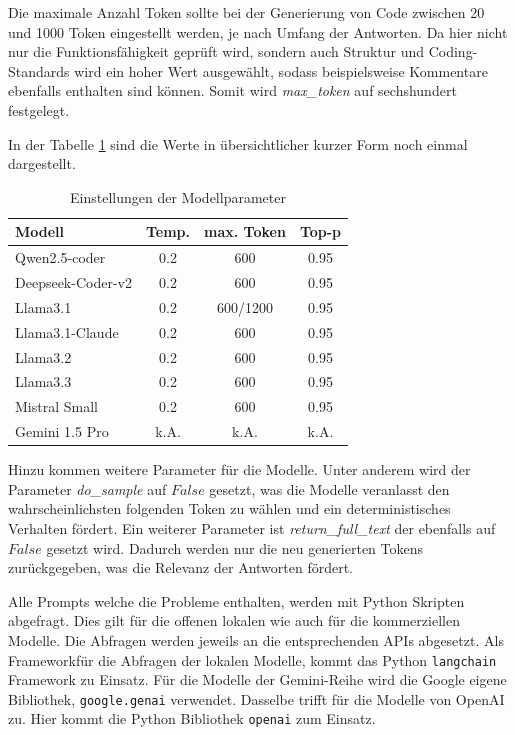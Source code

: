 Die maximale Anzahl Token sollte bei der Generierung von Code zwischen 20 und 1000 Token eingestellt werden, je nach Umfang der Antworten. Da hier nicht nur die Funktionsfähigkeit geprüft wird, sondern auch Struktur und Coding-Standards wird ein hoher Wert ausgewählt, sodass beispielsweise Kommentare ebenfalls enthalten sind können. Somit wird \textit{max\_token} auf sechshundert festgelegt.\vspace{0.2cm}

In der Tabelle \ref{tab:params_for_llms} sind die Werte in übersichtlicher kurzer Form noch einmal dargestellt.

\begin{table}[!ht]
	\begin{tabular}{|l|c|c|c|}
		\hline
		\textbf{Modell} & \textbf{Temp.} & \textbf{max. Token} & \textbf{Top-p} \\
		\hline
		Qwen2.5-coder     &  0.2 &       600 & 0.95 \\
		Deepseek-Coder-v2 &  0.2 &       600 & 0.95 \\
		Llama3.1          &  0.2 &  600/1200 & 0.95 \\
		Llama3.1-Claude   &  0.2 &       600 & 0.95 \\
		Llama3.2          &  0.2 &       600 & 0.95 \\
		Llama3.3          &  0.2 &       600 & 0.95 \\
		Mistral Small     &  0.2 &       600 & 0.95 \\
		Gemini 1.5 Pro    & k.A. &      k.A. & k.A. \\
		\hline
	\end{tabular}
	\centering
	\caption{Einstellungen der Modellparameter}
	\label{tab:params_for_llms}
\end{table}

Hinzu kommen weitere Parameter für die Modelle. Unter anderem wird der Parameter \textit{do\_sample} auf $False$ gesetzt, was die Modelle veranlasst den wahrscheinlichsten folgenden Token zu wählen und ein deterministisches Verhalten fördert. Ein weiterer Parameter ist \textit{return\_full\_text} der ebenfalls auf $False$ gesetzt wird. Dadurch werden nur die neu generierten Tokens zurückgegeben, was die Relevanz der Antworten fördert.\vspace{0.2cm}

Alle Prompts welche die Probleme enthalten, werden mit Python Skripten abgefragt. Dies gilt für die offenen lokalen wie auch für die kommerziellen Modelle. Die Abfragen werden jeweils an die entsprechenden APIs abgesetzt. Als Frameworkfür die Abfragen der lokalen Modelle, kommt das Python \texttt{langchain} Framework zu Einsatz. Für die Modelle der Gemini-Reihe wird die Google eigene Bibliothek, \texttt{google.genai} verwendet. Dasselbe trifft für die Modelle von OpenAI zu. Hier kommt die Python Bibliothek \texttt{openai} zum Einsatz.

